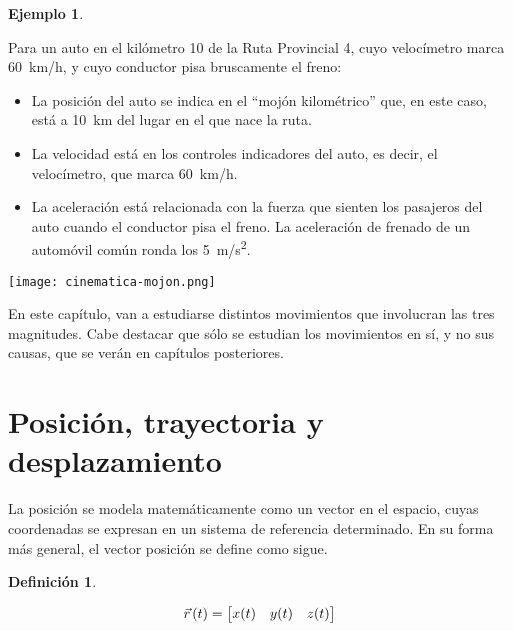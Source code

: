 \documentclass[a5paper,12pt,twoside]{book}
\newtheorem{defn}{{Definición}}[chapter]
\newtheorem{example}{{Ejemplo}}[chapter]
\begin{document}
\begin{mdframed}[style=MyFrame2]
    \begin{example}
        \label{eg:mag}
    \end{example}

    Para un auto en el kilómetro 10 de la Ruta Provincial 4, cuyo velocímetro marca \SI{60}{\kilo\meter/\hour}, y cuyo conductor pisa bruscamente el freno:
    \begin{itemize}
        \item La posición del auto se indica en el ``mojón kilométrico'' que, en este caso, está a \SI{10}{km} del lugar en el que nace la ruta.
        \item La velocidad está en los controles indicadores del auto, es decir, el velocímetro, que marca \SI{60}{\kilo\meter/\hour}.
        \item La aceleración está relacionada con la fuerza que sienten los pasajeros del auto cuando el conductor pisa el freno.
        La aceleración de frenado de un automóvil común ronda los \SI{5}{\meter/\second\squared}.
    \end{itemize}

    \begin{center}
        \texttt{[image: cinematica-mojon.png]}
    \end{center}
\end{mdframed}

En este capítulo, van a estudiarse distintos movimientos que involucran las tres magnitudes.
Cabe destacar que sólo se estudian los movimientos en sí, y no sus causas, que se verán en capítulos posteriores.

\section{Posición, trayectoria y desplazamiento}

La posición se modela matemáticamente como un vector en el espacio, cuyas coordenadas se expresan en un sistema de referencia determinado.
En su forma más general, el vector posición se define como sigue.

\begin{mdframed}[style=MyFrame1]
    \begin{defn}
        \label{defn:position}
    \end{defn}
    \begin{equation*}
        \vec{r}\hspace{0.05cm}(t) = \begin{bmatrix} x(t) & y(t) & z(t) \end{bmatrix}
    \end{equation*}
\end{mdframed}
\end{document}
